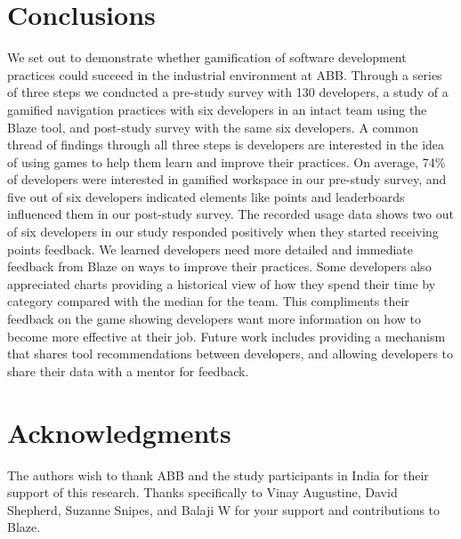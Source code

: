\documentclass{sig-alternate}
\begin{document}
\section{Conclusions}
We set out to demonstrate whether gamification of software development practices could succeed in the industrial environment at ABB.  Through a series of three steps we conducted a pre-study survey with 130 developers, a study of a gamified navigation practices with six developers in an intact team using the Blaze tool, and post-study survey with the same six developers.  A common thread of findings through all three steps is developers are interested in the idea of using games to help them learn and improve their practices.  On average, 74\% of developers were interested in gamified workspace in our pre-study survey, and five out of six developers indicated elements like points and leaderboards influenced them in our post-study survey.  The recorded usage data shows two out of six developers in our study responded positively when they started receiving points feedback.  We learned developers need more detailed and immediate feedback from Blaze on ways to improve their practices.  Some developers also appreciated charts providing a historical view of how they spend their time by category compared with the median for the team.  This compliments their feedback on the game showing developers want more information on how to become more effective at their job.  Future work includes providing a mechanism that shares tool recommendations between developers, and allowing developers to share their data with a mentor for feedback.

\section{Acknowledgments}
The authors wish to thank ABB and the study participants in India for their support of this research.  Thanks specifically to Vinay Augustine, David Shepherd, Suzanne Snipes, and Balaji W for your support and contributions to Blaze.
\end{document}
